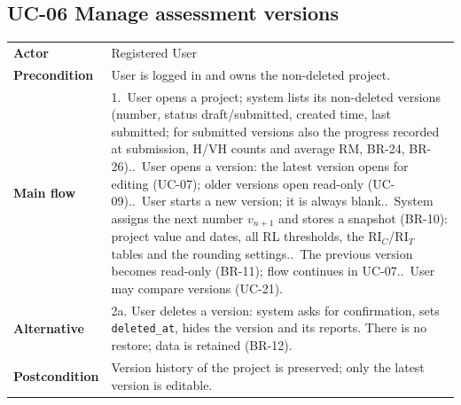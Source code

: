 \documentclass[11pt,a4paper]{article}
\newcommand{\RIC}{\mathrm{RI}_{C}}
\newcommand{\RIT}{\mathrm{RI}_{T}}
\begin{document}
\noindent\begin{minipage}{\linewidth}
\subsection*{UC-06 Manage assessment versions}
\begin{tabularx}{\linewidth}{@{}>{\raggedright\leavevmode\bfseries\color{creBlue}}p{2.6cm} Y@{}}
\toprule
Actor & Registered User \\
Precondition & User is logged in and owns the non-deleted project. \\
Main flow & 1.~User opens a project; system lists its non-deleted versions (number, status draft/submitted, created time, last submitted; for submitted versions also the progress recorded at submission, H/VH counts and average RM, BR-24, BR-26)..~User opens a version: the latest version opens for editing (UC-07); older versions open read-only (UC-09)..~User starts a new version; it is always blank..~System assigns the next number $v_{n+1}$ and stores a snapshot (BR-10): project value and dates, all RL thresholds, the $\RIC$/$\RIT$ tables and the rounding settings..~The previous version becomes read-only (BR-11); flow continues in UC-07..~User may compare versions (UC-21). \\
Alternative & 2a. User deletes a version: system asks for confirmation, sets \texttt{deleted\_at}, hides the version and its reports. There is no restore; data is retained (BR-12). \\
Postcondition & Version history of the project is preserved; only the latest version is editable. \\
\bottomrule
\end{tabularx}
\end{minipage}
\par\medskip
\end{document}
